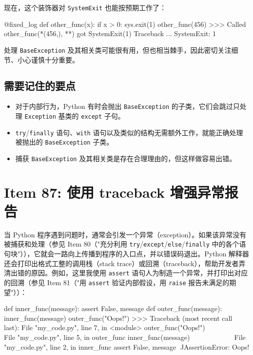 现在，这个装饰器对 \texttt{SystemExit} 也能按预期工作了：

\begin{codebox}[python]
@fixed_log
def other_func(x):
    if x > 0:
        sys.exit(1)
other_func(456)
>>>
Called other_func(*(456,), **{}) got SystemExit(1)
Traceback ...
SystemExit: 1
\end{codebox}

处理 \texttt{BaseException} 及其相关类可能很有用，但也相当棘手，因此密切关注细节、小心谨慎十分重要。

\subsection{需要记住的要点}

\begin{itemize}
\item 对于内部行为，Python 有时会抛出 \texttt{BaseException} 的子类，它们会跳过只处理 \texttt{Exception} 基类的 \texttt{except} 子句。
\item \texttt{try}/\texttt{finally} 语句、\texttt{with} 语句以及类似的结构无需额外工作，就能正确处理被抛出的 \texttt{BaseException} 子类。
\item 捕获 \texttt{BaseException} 及其相关类是存在合理理由的，但这样做容易出错。
\end{itemize}

\section{Item 87: 使用 traceback 增强异常报告}

当 Python 程序遇到问题时，通常会引发一个异常（exception）。如果该异常没有被捕获和处理（参见 Item 80（"充分利用 \texttt{try}/\texttt{except}/\texttt{else}/\texttt{finally} 中的各个语句块"）），它就会一路向上传播到程序的入口点，并以错误码退出。Python 解释器还会打印出格式工整的调用栈（stack trace）或回溯（traceback），帮助开发者弄清出错的原因。例如，这里我使用 \texttt{assert} 语句人为制造一个异常，并打印出对应的回溯（参见 Item 81（"用 \texttt{assert} 验证内部假设，用 \texttt{raise} 报告未满足的期望"））：

\begin{codebox}[python]
def inner_func(message):
    assert False, message
def outer_func(message):
    inner_func(message)
outer_func("Oops!")
>>>
Traceback (most recent call last):
  File "my_code.py", line 7, in <module>
    outer_func("Oops!")
    ~~~~~~~~~~^^^^^^^^^
  File "my_code.py", line 5, in outer_func
    inner_func(message)
    ~~~~~~~~~~^^^^^^^^^
  File "my_code.py", line 2, in inner_func
    assert False, message
           ^^^^^
AssertionError: Oops!
\end{codebox}

